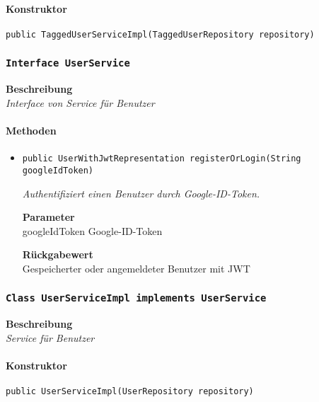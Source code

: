     \paragraph*{Konstruktor}
    \texttt{public TaggedUserServiceImpl(TaggedUserRepository repository)}
    \subsubsection{\texttt{Interface UserService}}
    \textbf{Beschreibung} \\
    \textit{Interface von Service für Benutzer}
    \paragraph*{Methoden}
    \begin{itemize}
    	\item{\texttt{public UserWithJwtRepresentation registerOrLogin(String googleIdToken)}}
    	
    	\textit{Authentifiziert einen Benutzer durch Google-ID-Token.}
    	
    	\textbf{Parameter} \\
    	googleIdToken Google-ID-Token
    	
    	\textbf{Rückgabewert} \\
    	Gespeicherter oder angemeldeter Benutzer mit JWT
    \end{itemize}
    \subsubsection{\texttt{Class UserServiceImpl implements UserService}}
    \textbf{Beschreibung} \\
    \textit{Service für Benutzer}
    \paragraph*{Konstruktor}
    \texttt{public UserServiceImpl(UserRepository repository)}

%